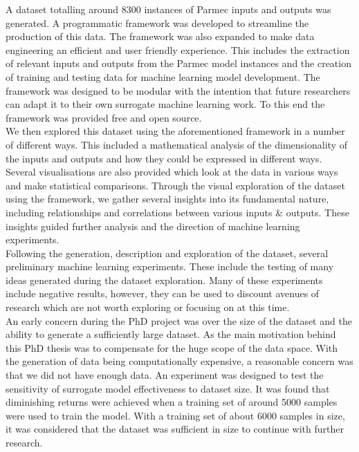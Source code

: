 \noindent
A dataset totalling around 8300 instances of Parmec inputs and outputs was generated. A programmatic framework was developed to streamline the production of this data. The framework was also expanded to make data engineering an efficient and user friendly experience. This includes the extraction of relevant inputs and outputs from the Parmec model instances and the creation of training and testing data for  machine learning model development. The framework was designed to be modular with the intention that future researchers can adapt it to their own surrogate machine learning work. To this end the framework was provided free and open source.\\

\noindent
We then explored this dataset using the aforementioned framework in a number of different ways. This included a mathematical analysis of the dimensionality of the inputs and outputs and how they could be expressed in different ways. Several visualisations are also provided which look at the data in various ways and make statistical comparisons. Through the visual exploration of the dataset using the framework, we gather several insights into its fundamental nature, including relationships and correlations between various inputs \& outputs. These insights guided further analysis and the direction of machine learning experiments. \\

\noindent
Following the generation, description and exploration of the dataset, several preliminary machine learning experiments. These include the testing of many ideas generated during the dataset exploration. Many of these experiments include negative results, however, they can be used to discount avenues of research which are not worth exploring or focusing on at this time.\\

\noindent
 An early concern during the PhD project was over the size of the dataset and the ability to generate a sufficiently large dataset.  As the main motivation behind this PhD thesis was to compensate for the huge scope of the data space. With the generation of data being computationally expensive, a reasonable concern was that we did not have enough data. An experiment was designed to test the sensitivity of surrogate model effectiveness to dataset size. It was found that diminishing returns were achieved when a training set of around 5000 samples were used to train the model. With a training set of about 6000 samples in size, it was considered that the dataset was sufficient in size to continue with further research.  \\
 
